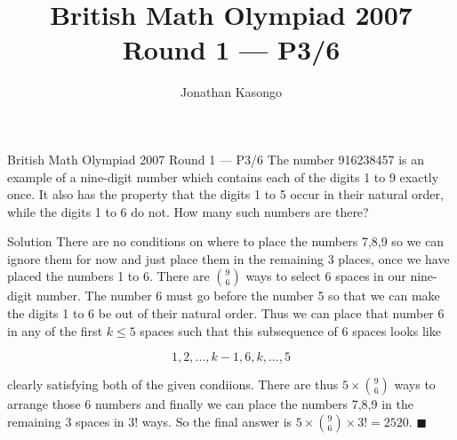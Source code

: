\documentclass{article}
\author{Jonathan Kasongo}
\title{British Math Olympiad 2007 Round 1 --- P3/6}
\begin{document}
\maketitle

\begin{problem}{British Math Olympiad 2007 Round 1 --- P3/6}
The number 916238457 is an example of a nine-digit number which
contains each of the digits 1 to 9 exactly once. It also has the property
that the digits 1 to 5 occur in their natural order, while the digits 1
to 6 do not. How many such numbers are there?
\end{problem}

\begin{solution}{Solution}
There are no conditions on where to place the numbers 7,8,9 so we can
ignore them for now and just place them in the remaining 3 places, once
we have placed the numbers 1 to 6. There are $\binom{9}{6}$ ways to
select 6 spaces in our nine-digit number. The number 6 must go before the
number 5 so that we can make the digits 1 to 6 be out of their natural
order. Thus we can place that number 6 in any of the first $k \leq 5$
spaces such that this subsequence of 6 spaces looks like

$$
1,2,...,k-1,6,k,...,5
$$

clearly satisfying both of the given condiions. There are thus
$5 \times \binom{9}{6}$ ways to arrange those 6 numbers and finally we
can place the numbers 7,8,9 in the remaining 3 spaces in $3!$ ways. So
the final answer is $5 \times \binom{9}{6} \times 3! = 2520$.
$\blacksquare$
\end{solution}
\end{document}
